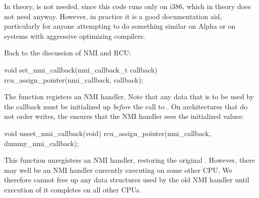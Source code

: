 In theory,  is not needed, since this code runs
only on i386, which in theory does not need 
anyway.
However, in practice it is a good documentation aid, particularly
for anyone attempting to do something similar on Alpha or on systems
with aggressive optimizing compilers.

\QuickQuizEnd

Back to the discussion of NMI and RCU\@:

\begin{VerbatimU}
	void set_nmi_callback(nmi_callback_t callback)
	{
		rcu_assign_pointer(nmi_callback, callback);
	}
\end{VerbatimU}

The  function registers an NMI handler.
Note that any
data that is to be used by the callback must be initialized up \emph{before}
the call to .
On architectures that do not order
writes, the  ensures that the NMI handler sees the
initialized values:

\begin{VerbatimU}
	void unset_nmi_callback(void)
	{
		rcu_assign_pointer(nmi_callback, dummy_nmi_callback);
	}
\end{VerbatimU}

This function unregisters an NMI handler, restoring the original
.
However, there may well be an NMI handler
currently executing on some other CPU\@.
We therefore cannot free
up any data structures used by the old NMI handler until execution
of it completes on all other CPUs.

